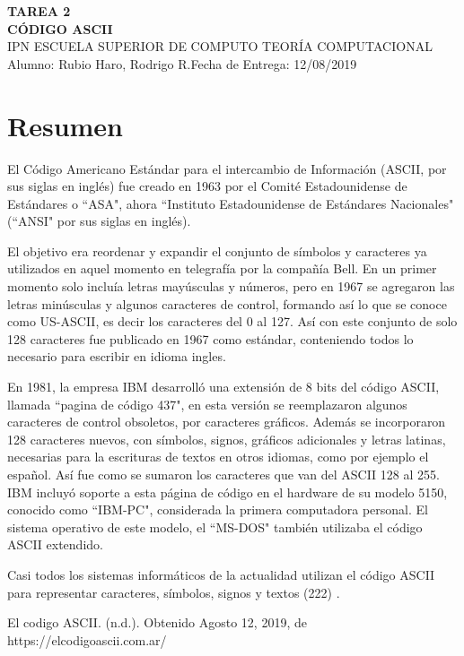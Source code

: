 \documentclass[letterpaper, 11pt]{article}
\begin{document}
\noindent
\large\textbf{TAREA 2} \\
\textbf{CÓDIGO ASCII} \\
\normalsize IPN \textbar ESCUELA SUPERIOR DE COMPUTO \textbar TEORÍA COMPUTACIONAL \\
Alumno: Rubio Haro, Rodrigo R.\hfill Fecha de Entrega: 12/08/2019 \\
 

\section*{Resumen}
El Código Americano Estándar para el intercambio de Información (ASCII, por sus siglas en inglés) fue creado en 1963 por el Comité Estadounidense de Estándares o ``ASA", ahora ``Instituto Estadounidense de Estándares Nacionales" (``ANSI" por sus siglas en inglés).

\noindent El objetivo era reordenar y expandir el conjunto de símbolos y caracteres ya utilizados en aquel momento en telegrafía por la compañía Bell. En un primer momento solo incluía letras mayúsculas y números, pero en 1967 se agregaron las letras minúsculas y algunos caracteres de control, formando así lo que se conoce como US-ASCII, es decir los caracteres del 0 al 127. 
Así con este conjunto de solo 128 caracteres fue publicado en 1967 como estándar, conteniendo todos lo necesario para escribir en idioma ingles.

\noindent En 1981, la empresa IBM desarrolló una extensión de 8 bits del código ASCII, llamada ``pagina de código 437", en esta versión se reemplazaron algunos caracteres de control obsoletos, por caracteres gráficos. Además se incorporaron 128 caracteres nuevos, con símbolos, signos, gráficos adicionales y letras latinas, necesarias para la escrituras de textos en otros idiomas, como por ejemplo el español. Así fue como se sumaron los caracteres que van del ASCII 128 al 255.
IBM incluyó soporte a esta página de código en el hardware de su modelo 5150, conocido como ``IBM-PC", considerada la primera computadora personal. El sistema operativo de este modelo, el ``MS-DOS" también utilizaba el código ASCII extendido.

\noindent Casi todos los sistemas informáticos de la actualidad utilizan el código ASCII para representar caracteres, símbolos, signos y textos (222) .

\begin{thebibliography}{*}
     El codigo ASCII. (n.d.). Obtenido Agosto 12, 2019, de https://elcodigoascii.com.ar/
    \end{thebibliography}
\end{document}
